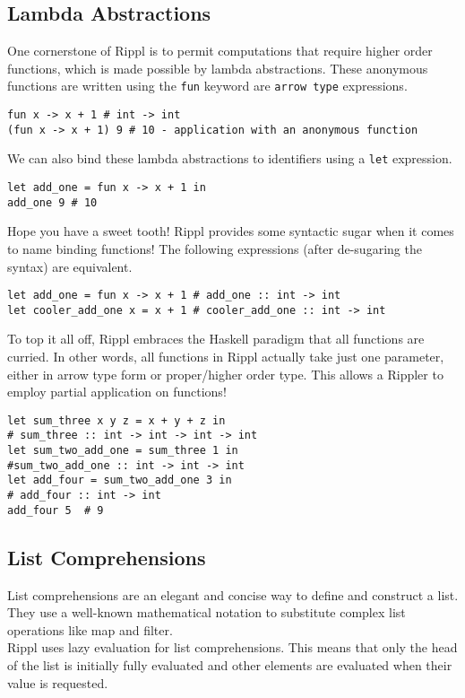 \documentclass[5pt]{article}
\begin{document}
\subsection{Lambda Abstractions}
One cornerstone of Rippl is to permit computations that require higher order functions, which is made possible by lambda abstractions. These anonymous functions are written using the \texttt{fun} keyword are \texttt{arrow type} expressions.
\begin{lstlisting}[language=rippl]
fun x -> x + 1 # int -> int
(fun x -> x + 1) 9 # 10 - application with an anonymous function
\end{lstlisting}
We can also bind these lambda abstractions to identifiers using a \texttt{let} expression. 
\begin{lstlisting}[language=rippl]
let add_one = fun x -> x + 1 in
add_one 9 # 10
\end{lstlisting}
Hope you have a sweet tooth! Rippl provides some syntactic sugar when it comes to name binding functions! The following expressions (after de-sugaring the syntax) are equivalent.
\begin{lstlisting}[language=rippl]
let add_one = fun x -> x + 1 # add_one :: int -> int
let cooler_add_one x = x + 1 # cooler_add_one :: int -> int
\end{lstlisting}
To top it all off, Rippl embraces the Haskell paradigm that all functions are curried. In other words, all functions in Rippl actually take just one parameter, either in arrow type form or proper/higher order type. This allows a Rippler to employ partial application on functions!
\begin{lstlisting}[language=rippl]
let sum_three x y z = x + y + z in
# sum_three :: int -> int -> int -> int
let sum_two_add_one = sum_three 1 in
#sum_two_add_one :: int -> int -> int
let add_four = sum_two_add_one 3 in 
# add_four :: int -> int
add_four 5	# 9
\end{lstlisting}
\pagebreak

\subsection{List Comprehensions}
List comprehensions are an elegant and concise way to define and construct a list. They use a well-known mathematical notation to substitute complex list operations like map and filter. \\

Rippl uses lazy evaluation for list comprehensions. This means that only the head of the list is initially fully evaluated and other elements are evaluated when their value is requested. \\
\end{document}
